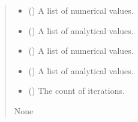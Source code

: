 \documentclass[a4paper,11pt,english,openany]{sphinxmanual}
\begin{document}
\begin{fulllineitems}
\begin{quote}
\begin{description}
\begin{itemize}
\end{itemize}

\end{description}\end{quote}

\begin{fulllineitems}
\label{\detokenize{api/spyice.utils.error_norms:spyice.utils.error_norms.ErrorNorms.__init__}}
\pysigstartsignatures
{}
\pysigstopsignatures\begin{quote}\begin{description}
\begin{itemize}
\item {} 
\sphinxAtStartPar
{} () \textendash{} A list of numerical values.

\item {} 
\sphinxAtStartPar
{} () \textendash{} A list of analytical values.

\end{itemize}

\begin{itemize}
\item {} 
\sphinxAtStartPar
{} () \textendash{} A list of numerical values.

\item {} 
\sphinxAtStartPar
{} () \textendash{} A list of analytical values.

\item {} 
\sphinxAtStartPar
{} () \textendash{} The count of iterations.

\end{itemize}

\sphinxAtStartPar
None


\end{description}
\end{quote}
\end{fulllineitems}
\end{fulllineitems}
\end{document}
